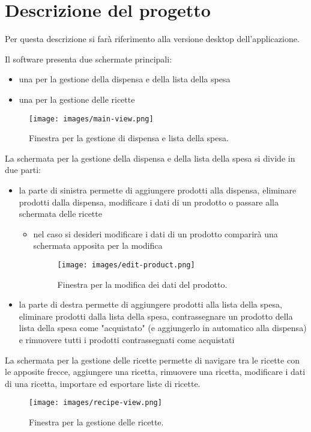 \chapter{Descrizione del progetto}

Per questa descrizione si farà riferimento alla versione desktop dell'applicazione.

Il software presenta due schermate principali:

\begin{itemize}

  \item una per la gestione della dispensa e della lista della spesa
  \item una per la gestione delle ricette

\end{itemize}

\begin{figure}[H]
    \texttt{[image: images/main-view.png]}
    \caption{Finestra per la gestione di dispensa e lista della spesa.}
    \label{fig:mainview}
\end{figure}

La schermata per la gestione della dispensa e della lista della spesa si divide in due parti:

\begin{itemize}
  \item la parte di sinistra permette di aggiungere prodotti alla dispensa, eliminare prodotti dalla dispensa, modificare i dati di un prodotto o passare alla schermata delle ricette
  \begin{itemize}
    \item nel caso si desideri modificare i dati di un prodotto comparirà una schermata apposita per la modifica

    \begin{figure}[H]
        \texttt{[image: images/edit-product.png]}
        \caption{Finestra per la modifica dei dati del prodotto.}
        \label{fig:editproduct}
    \end{figure}

  \end{itemize}
  \item la parte di destra permette di aggiungere prodotti alla lista della spesa, eliminare prodotti dalla lista della spesa, contrassegnare un prodotto della lista della spesa come "acquistato" (e aggiungerlo in automatico alla dispensa) e rimuovere tutti i prodotti contrassegnati come acquistati
\end{itemize}

\newpage

La schermata per la gestione delle ricette permette di navigare tra le ricette con le apposite frecce, aggiungere una ricetta, rimuovere una ricetta, modificare i dati di una ricetta, importare ed esportare liste di ricette.

\begin{figure}[H]
    \texttt{[image: images/recipe-view.png]}
    \caption{Finestra per la gestione delle ricette.}
    \label{fig:recipeview}
\end{figure}
